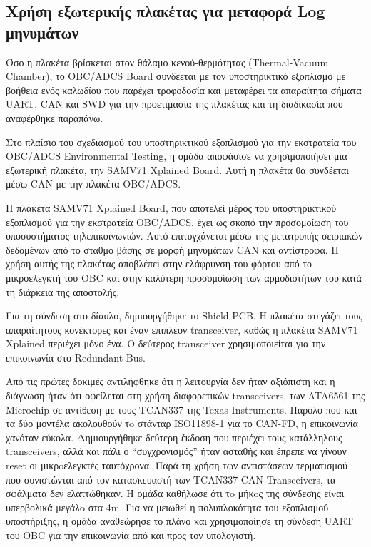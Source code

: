 \documentclass[a4paper,nobib,justified]{tufte-book}
\begin{document}
\subsection{Χρήση εξωτερικής πλακέτας για μεταφορά Log μηνυμάτων}
Όσο η πλακέτα βρίσκεται στον θάλαμο κενού-θερμότητας (Thermal-Vacuum Chamber), το OBC/ADCS Board συνδέεται με τον υποστηρικτικό εξοπλισμό με βοήθεια ενός καλωδίου που παρέχει τροφοδοσία και μεταφέρει τα απαραίτητα σήματα UART, CAN και SWD για την προετιμασία της πλακέτας και τη διαδικασία που αναφέρθηκε παραπάνω.

Στο πλαίσιο του σχεδιασμού του υποστηρικτικού εξοπλισμού για την εκστρατεία του OBC/ADCS Environmental Testing, η ομάδα αποφάσισε να χρησιμοποιήσει μια εξωτερική πλακέτα, την SAMV71 Xplained Board. Αυτή η πλακέτα θα συνδέεται μέσω CAN με την πλακέτα OBC/ADCS. 

Η πλακέτα SAMV71 Xplained Board, που αποτελεί μέρος του υποστηρικτικού εξοπλισμού για την εκστρατεία OBC/ADCS, έχει ως σκοπό την προσομοίωση του υποσυστήματος τηλεπικοινωνιών. Αυτό επιτυγχάνεται μέσω της μετατροπής σειριακών δεδομένων από το σταθμό βάσης σε μορφή μηνυμάτων CAN και αντίστροφα. Η χρήση αυτής της πλακέτας αποβλέπει στην ελάφρυνση του φόρτου από το μικροελεγκτή του OBC και στην καλύτερη προσομοίωση των αρμοδιοτήτων του κατά τη διάρκεια της αποστολής.

Για τη σύνδεση στο δίαυλο, δημιουργήθηκε το Shield PCB. Η πλακέτα στεγάζει τους απαραίτητους κονέκτορες και έναν επιπλέον transceiver, καθώς η πλακέτα SAMV71 Xplained περιέχει μόνο ένα. Ο δεύτερος transceiver χρησιμοποιείται για την επικοινωνία στο Redundant Bus.

Από τις πρώτες δοκιμές αντιλήφθηκε ότι η λειτουργία δεν ήταν αξιόπιστη και η διάγνωση ήταν ότι οφείλεται στη χρήση διαφορετικών transceivers, των ATA6561 της Microchip σε αντίθεση με τους TCAN337 της Texas Instruments. Παρόλο που και τα δύο μοντέλα ακολουθούν τo στάνταρ ISO11898-1 για το CAN-FD, η επικοινωνία χανόταν εύκολα. Δημιουργήθηκε δεύτερη έκδοση που περιέχει τους κατάλληλους transceivers, αλλά και πάλι ο “συγχρονισμός” ήταν ασταθής και έπρεπε να γίνουν reset οι μικρoελεγκτές ταυτόχρονα. Παρά τη χρήση των αντιστάσεων τερματισμού που συνιστώνται από τον κατασκευαστή των TCAN337 CAN Transceivers, τα σφάλματα δεν ελαττώθηκαν. Η ομάδα καθήλωσε ότι τo μήκoς της σύνδεσης είvαι υπερβολικά μεγάλo στα 4m. Για να μειωθεί η πολυπλοκότητα του εξοπλισμού υποστήριξης, η ομάδα αναθεώρησε το πλάνο και χρησιμοποίησε τη σύνδεση UART του OBC για την επικοινωνία από και προς τον υπολογιστή.
\end{document}
